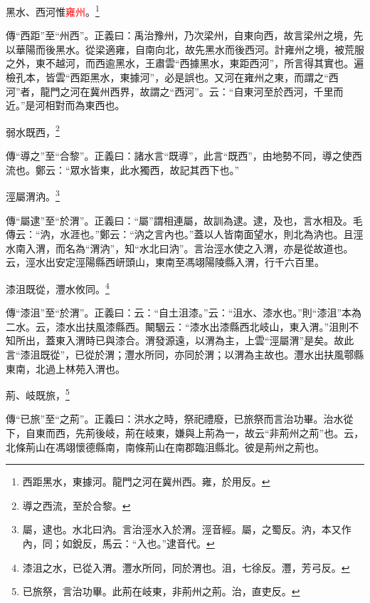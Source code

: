 黑水、西河惟\textcolor{red}{雍州}。\footnote{西距黑水，東據河。龍門之河在冀州西。雍，於用反。}

{\noindent\zhuan{}\fzbyks 傳“西距”至“州西”。正義曰：禹治豫州，乃次梁州，自東向西，故言梁州之境，先以華陽而後黑水。從梁適雍，自南向北，故先黑水而後西河。計雍州之境，被荒服之外，東不越河，而西逾黑水，王肅雲“西據黑水，東距西河”，所言得其實也。遍檢孔本，皆雲“西距黑水，東據河”，必是誤也。又河在雍州之東，而謂之“西河”者，龍門之河在冀州西界，故謂之“西河”。云：“自東河至於西河，千里而近。”是河相對而為東西也。 \par}

弱水既西，\footnote{導之西流，至於合黎。}

{\noindent\zhuan{}\fzbyks 傳“導之”至“合黎”。正義曰：諸水言“既導”，此言“既西”，由地勢不同，導之使西流也。鄭云：“眾水皆東，此水獨西，故記其西下也。” \par}

涇屬渭汭。\footnote{屬，逮也。水北曰汭。言治涇水入於渭。涇音經。屬，之蜀反。汭，本又作內，同；如銳反，馬云：“入也。”逮音代。}

{\noindent\zhuan{}\fzbyks 傳“屬逮”至“於渭”。正義曰：“屬”謂相連屬，故訓為逮。逮，及也，言水相及。毛傳云：“汭，水涯也。”鄭云：“汭之言內也。”蓋以人皆南面望水，則北為汭也。且涇水南入渭，而名為“渭汭”，知“水北曰汭”。言治涇水使之入渭，亦是從故道也。云，涇水出安定涇陽縣西岍頭山，東南至馮翊陽陵縣入渭，行千六百里。 \par}

漆沮既從，灃水攸同。\footnote{漆沮之水，已從入渭。灃水所同，同於渭也。沮，七徐反。灃，芳弓反。}

{\noindent\zhuan{}\fzbyks 傳“漆沮”至“於渭”。正義曰：云：“自土沮漆。”云：“沮水、漆水也。”則“漆沮”本為二水。云，漆水出扶風漆縣西。闞駰云：“漆水出漆縣西北岐山，東入渭。”沮則不知所出，蓋東入渭時已與漆合。渭發源遠，以渭為主，上雲“涇屬渭”是矣。故此言“漆沮既從”，已從於渭；灃水所同，亦同於渭；以渭為主故也。灃水出扶風鄠縣東南，北過上林苑入渭也。 \par}

荊、岐既旅，\footnote{已旅祭，言治功畢。此荊在岐東，非荊州之荊。治，直吏反。}

{\noindent\zhuan{}\fzbyks 傳“已旅”至“之荊”。正義曰：洪水之時，祭祀禮廢，已旅祭而言治功畢。治水從下，自東而西，先荊後岐，荊在岐東，嫌與上荊為一，故云“非荊州之荊”也。云，北條荊山在馮翊懷德縣南，南條荊山在南郡臨沮縣北。彼是荊州之荊也。 \par}

